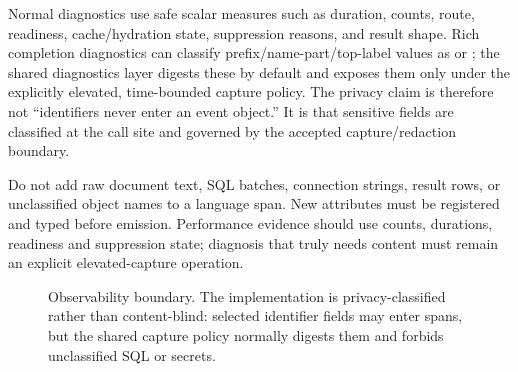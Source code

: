 \documentclass[11pt]{article}
\newcommand{\code}[1]{\texttt{\detokenize{#1}}}
\begin{document}
Normal diagnostics use safe scalar measures such as duration, counts, route, readiness, cache/hydration state, suppression reasons, and result shape. Rich completion diagnostics can classify prefix/name-part/top-label values as \code{user.text} or \code{object.name}; the shared diagnostics layer digests these by default and exposes them only under the explicitly elevated, time-bounded capture policy. The privacy claim is therefore not ``identifiers never enter an event object.'' It is that sensitive fields are classified at the call site and governed by the accepted capture/redaction boundary.

\begin{designbox}[title={Observability contract}]
Do not add raw document text, SQL batches, connection strings, result rows, or unclassified object names to a language span. New attributes must be registered and typed before emission. Performance evidence should use counts, durations, readiness and suppression state; diagnosis that truly needs content must remain an explicit elevated-capture operation.
\end{designbox}

\begin{figure}[H]
\centering
{}
\caption{Observability boundary. The implementation is privacy-classified rather than content-blind: selected identifier fields may enter spans, but the shared capture policy normally digests them and forbids unclassified SQL or secrets.}
\label{fig:observability}
\end{figure}
\end{document}
